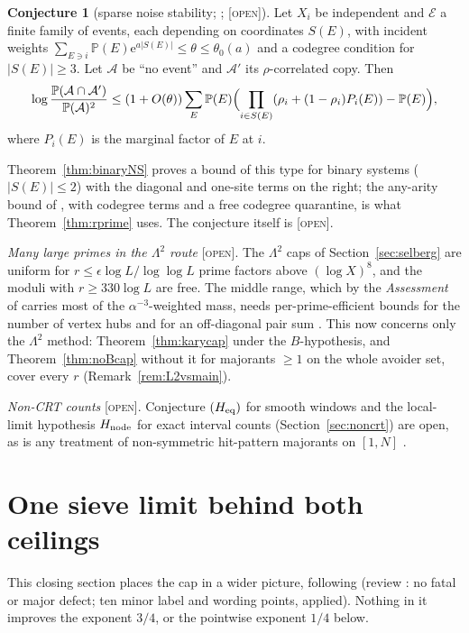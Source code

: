 \documentclass[10pt,reqno]{amsart}
\theoremstyle{definition}
\newtheorem{conjecture}[theorem]{Conjecture}
\theoremstyle{remark}
\newcommand{\A}{\mathcal A}
\newcommand{\Prob}{\mathbb P}
\newcommand{\e}{\mathrm e}
\newcommand{\lab}[1]{\textup{[\textsc{#1}]}}
\begin{document}
\begin{conjecture}[sparse noise stability; {\cite[Conj.~6.8]{TW}}; \lab{open}]\label{conj:sparseNS}
Let $X_i$ be independent and $\mathcal E$ a finite family of events, each
depending on coordinates $S(E)$, with incident weights
$\sum_{E\ni i}\Prob(E)\e^{a|S(E)|}\leq\theta\leq\theta_0(a)$ and a codegree
condition for $|S(E)|\geq3$.  Let $\A$ be ``no event'' and $\A'$ its
$\rho$-correlated copy.  Then
\[
 \log\frac{\Prob(\A\cap\A')}{\Prob(\A)^2}\leq(1+O(\theta))\sum_E\Prob(E)\Bigl(\prod_{i\in S(E)}(\rho_i+(1-\rho_i)P_i(E))-\Prob(E)\Bigr),
\]
where $P_i(E)$ is the marginal factor of $E$ at $i$.
\end{conjecture}
Theorem~\ref{thm:binaryNS} proves a bound of this type for binary systems
($|S(E)|\leq2$) with the diagonal and one-site terms on the right; the
any-arity bound of \cite[Lemmas~6.1, 6.2]{TW3}, with codegree terms and a
free codegree quarantine, is what Theorem~\ref{thm:rprime} uses.  The
conjecture itself is \lab{open}.

\emph{Many large primes in the $\Lambda^2$ route} \lab{open}.  The
$\Lambda^2$ caps of Section~\ref{sec:selberg} are uniform for
$r\leq\epsilon\log L/\log\log L$ prime factors above $(\log X)^8$, and the
moduli with $r\geq330\log L$ are free.  The middle range, which by the
\emph{Assessment} of \cite[\S9.3]{TW4} carries most
of the $\alpha^{-3}$-weighted mass, needs per-prime-efficient bounds for
the number of vertex hubs and for an off-diagonal pair sum
\cite[\S12]{TW4}.  This now concerns only the $\Lambda^2$ method:
Theorem~\ref{thm:karycap} under the $B$-hypothesis, and
Theorem~\ref{thm:noBcap} without it for majorants $\geq1$ on the whole
avoider set, cover every $r$ (Remark~\ref{rem:L2vsmain}).

\emph{Non-CRT counts} \lab{open}.  Conjecture $(H_{\rm eq})$ for smooth
windows and the local-limit hypothesis $H_{\rm node}$ for exact interval
counts (Section~\ref{sec:noncrt}) are open, as is any treatment of
non-symmetric hit-pattern majorants on $[1,N]$ \cite[\S8.6]{NC}.

\section{One sieve limit behind both ceilings}\label{sec:unified}

This closing section places the cap in a wider picture, following
\cite{CU} (review \cite{CUrev}: no fatal or major defect; ten minor label
and wording points, applied).  Nothing in it improves the exponent $3/4$, or
the pointwise exponent $1/4$ below.
\end{document}
